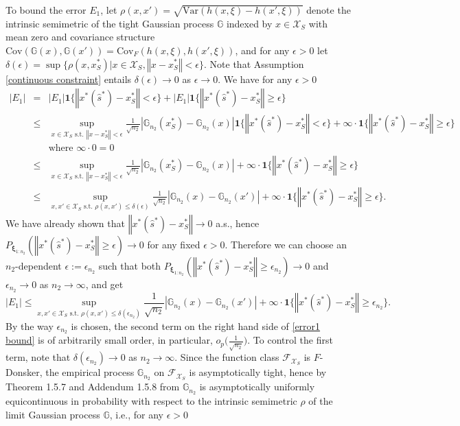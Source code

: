 \documentclass[mnsc,blindrev]{informs4} %
\newcommand{\norm}[1]{\left \Vert #1 \right\Vert}
\newcommand{\abs}[1]{\left \vert #1 \right\vert}
\begin{document}
To bound the error $E_1$, let $\rho(x,x')=\sqrt{\mathrm{Var}(h(x,\xi)-h(x',\xi))}$ denote the intrinsic semimetric of the tight Gaussian process $\mathbb G$ indexed by $x\in\mathcal X_S$ with mean zero and covariance structure $\mathrm{Cov}(\mathbb G(x),\mathbb G(x'))=\mathrm{Cov}_F(h(x,\xi),h(x',\xi))$, and for any $\epsilon>0$ let $\delta(\epsilon) = \sup\{\rho(x,x_S^*)\vert x\in\mathcal X_S,\norm{x-x_S^*}<\epsilon\}$. Note that Assumption \ref{continuous constraint} entails $\delta(\epsilon)\to 0$ as $\epsilon\to 0$. We have for any $\epsilon>0$
\begin{eqnarray*}
\abs{E_1}&=&\abs{E_1}\mathbf{1}\{\norm{x^*(\hat s^*)-x_S^*}<\epsilon\}+\abs{E_1}\mathbf{1}\{\norm{x^*(\hat s^*)-x_S^*}\geq\epsilon\}\\
&\leq& \sup_{x\in\mathcal X_S\text{ s.t. }\norm{x-x_S^*}< \epsilon}\frac{1}{\sqrt{n_2}}\abs{\mathbb G_{n_2}(x_S^*)-\mathbb G_{n_2}(x)}\mathbf{1}\{\norm{x^*(\hat s^*)-x_S^*}<\epsilon\}+\infty \cdot\mathbf{1}\{\norm{x^*(\hat s^*)-x_S^*}\geq\epsilon\}\\
&&\text{where }\infty\cdot 0=0\\
&\leq& \sup_{x\in\mathcal X_S\text{ s.t. }\norm{x-x_S^*}< \epsilon}\frac{1}{\sqrt{n_2}}\abs{\mathbb G_{n_2}(x_S^*)-\mathbb G_{n_2}(x)}+\infty \cdot\mathbf{1}\{\norm{x^*(\hat s^*)-x_S^*}\geq\epsilon\}\\
&\leq&\sup_{x,x'\in\mathcal X_S\text{ s.t. }\rho(x,x')\leq \delta(\epsilon)}\frac{1}{\sqrt{n_2}}\abs{\mathbb G_{n_2}(x)-\mathbb G_{n_2}(x')}+\infty \cdot\mathbf{1}\{\norm{x^*(\hat s^*)-x_S^*}\geq\epsilon\}.
\end{eqnarray*}
We have already shown that $\norm{x^*(\hat s^*)-x_S^*}\to 0$ a.s., hence $P_{\bm{\xi}_{1:n_2}}(\norm{x^*(\hat s^*)-x_S^*}\geq\epsilon)\to 0$ for any fixed $\epsilon>0$. Therefore we can choose an $n_2$-dependent $\epsilon:=\epsilon_{n_2}$ such that both $P_{\bm{\xi}_{1:n_2}}(\norm{x^*(\hat s^*)-x_S^*}\geq\epsilon_{n_2})\to 0$ and $\epsilon_{n_2}\to 0$ as $n_2\to\infty$, and get
\begin{equation}
\abs{E_1}\leq \sup_{x,x'\in\mathcal X_S\text{ s.t. }\rho(x,x')\leq \delta(\epsilon_{n_2})}\frac{1}{\sqrt{n_2}}\abs{\mathbb G_{n_2}(x)-\mathbb G_{n_2}(x')}+\infty \cdot\mathbf{1}\{\norm{x^*(\hat s^*)-x_S^*}\geq\epsilon_{n_2}\}.\label{error1 bound}
\end{equation}
By the way $\epsilon_{n_2}$ is chosen, the second term on the right hand side of \eqref{error1 bound} is of arbitrarily small order, in particular, $o_p\big(\frac{1}{\sqrt{n_2}}\big)$. To control the first term, note that $\delta(\epsilon_{n_2})\to 0$ as $n_2\to\infty$. Since the function class $\mathcal F_{\mathcal X_S}$ is $F$-Donsker, the empirical process $\mathbb G_{n_2}$ on $\mathcal F_{\mathcal X_S}$ is asymptotically tight, hence by Theorem 1.5.7 and Addendum 1.5.8 from \cite{van1996weak} $\mathbb G_{n_2}$ is asymptotically uniformly equicontinuous in probability with respect to the intrinsic semimetric $\rho$ of the limit Gaussian process $\mathbb G$, i.e., for any $\epsilon>0$
\end{document}
